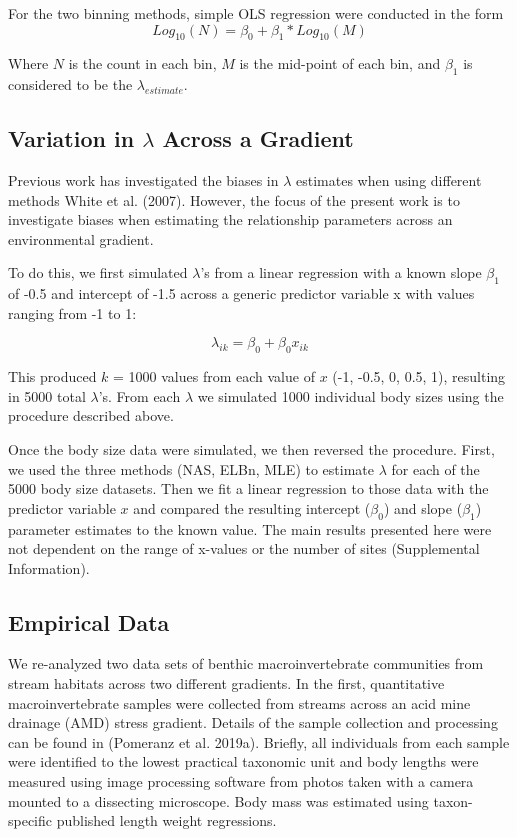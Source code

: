 \documentclass[
]{article}
\begin{document}
For the two binning methods, simple OLS regression were conducted in the
form \[Log_{10}(N) = \beta_0 + \beta_1 * Log_{10}(M)\]

Where \(N\) is the count in each bin, \(M\) is the mid-point of each
bin, and \(\beta_{1}\) is considered to be the \(\lambda_{estimate}\).

\hypertarget{variation-in-lambda-across-a-gradient}{%
\subsection{\texorpdfstring{Variation in \(\lambda\) Across a
Gradient}{Variation in \textbackslash lambda Across a Gradient}}\label{variation-in-lambda-across-a-gradient}}

Previous work has investigated the biases in \(\lambda\) estimates when
using different methods White et al. (2007). However, the focus of the
present work is to investigate biases when estimating the relationship
parameters across an environmental gradient.

To do this, we first simulated \(\lambda\)'s from a linear regression
with a known slope \(\beta_{1}\) of -0.5 and intercept of -1.5 across a
generic predictor variable x with values ranging from -1 to 1:

\[\lambda_{ik} = \beta_{0} + \beta_{0}x_{ik}\]

This produced \(k\) = 1000 values from each value of \(x\) (-1, -0.5, 0,
0.5, 1), resulting in 5000 total \(\lambda\)'s. From each \(\lambda\) we
simulated 1000 individual body sizes using the procedure described
above.

Once the body size data were simulated, we then reversed the procedure.
First, we used the three methods (NAS, ELBn, MLE) to estimate
\(\lambda\) for each of the 5000 body size datasets. Then we fit a
linear regression to those data with the predictor variable \(x\) and
compared the resulting intercept (\(\beta_{0}\)) and slope
(\(\beta_{1}\)) parameter estimates to the known value. The main results
presented here were not dependent on the range of x-values or the number
of sites (Supplemental Information).

\hypertarget{empirical-data}{%
\subsection{Empirical Data}\label{empirical-data}}

We re-analyzed two data sets of benthic macroinvertebrate communities
from stream habitats across two different gradients. In the first,
quantitative macroinvertebrate samples were collected from streams
across an acid mine drainage (AMD) stress gradient. Details of the
sample collection and processing can be found in (Pomeranz et al.
2019a). Briefly, all individuals from each sample were identified to the
lowest practical taxonomic unit and body lengths were measured using
image processing software from photos taken with a camera mounted to a
dissecting microscope. Body mass was estimated using taxon-specific
published length weight regressions.
\end{document}
